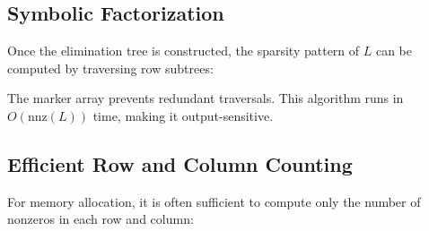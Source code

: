 \subsection{Symbolic Factorization}

Once the elimination tree is constructed, the sparsity pattern of $L$ can be computed by traversing row subtrees:


The marker array prevents redundant traversals. This algorithm runs in $O(\text{nnz}(L))$ time, making it output-sensitive.

\subsection{Efficient Row and Column Counting}

For memory allocation, it is often sufficient to compute only the number of nonzeros in each row and column:


